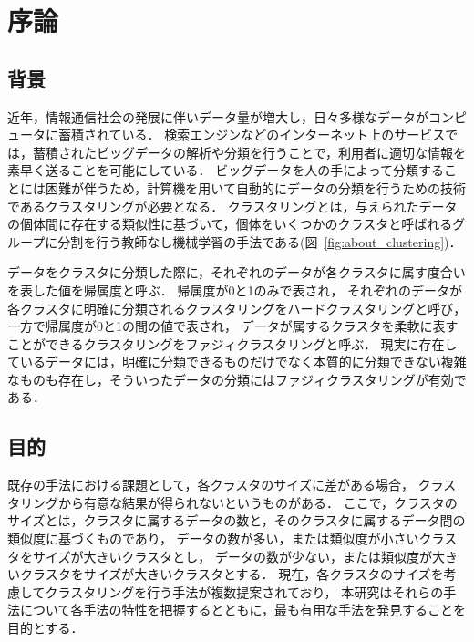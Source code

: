 \documentclass[a4j,12pt,dvipdfmx,oneside]{jsbook}
\theoremstyle{definition}
\begin{document}
\pagestyle{headings}
\def\thepage{\roman{page}}

\tableofcontents
\listoffigures
\listoftables
\newpage
\pagestyle{myheadings}

\chapter{序論}
\def\thepage{\arabic{page}}
\setcounter{page}{1}
\label{chap:first}

 \section{背景}\label{sec:background}
 
 近年，情報通信社会の発展に伴いデータ量が増大し，日々多様なデータがコンピュータに蓄積されている．
 検索エンジンなどのインターネット上のサービスでは，蓄積されたビッグデータの解析や分類を行うことで，利用者に適切な情報を素早く送ることを可能にしている．
 ビッグデータを人の手によって分類することには困難が伴うため，計算機を用いて自動的にデータの分類を行うための技術であるクラスタリングが必要となる．
 クラスタリングとは，与えられたデータの個体間に存在する類似性に基づいて，個体をいくつかのクラスタと呼ばれるグループに分割を行う教師なし機械学習の手法である(図~\ref{fig:about_clustering})．
 
 データをクラスタに分類した際に，それぞれのデータが各クラスタに属す度合いを表した値を帰属度と呼ぶ．
 帰属度が0と1のみで表され，
 それぞれのデータが各クラスタに明確に分類されるクラスタリングをハードクラスタリングと呼び，一方で帰属度が0と1の間の値で表され，
 データが属するクラスタを柔軟に表すことができるクラスタリングをファジィクラスタリングと呼ぶ．
 現実に存在しているデータには，明確に分類できるものだけでなく本質的に分類できない複雑なものも存在し，そういったデータの分類にはファジィクラスタリングが有効である．

 \section{目的}\label{sec:purpose}

 既存の手法における課題として，各クラスタのサイズに差がある場合，
 クラスタリングから有意な結果が得られないというものがある．
 ここで，クラスタのサイズとは，クラスタに属するデータの数と，そのクラスタに属するデータ間の類似度に基づくものであり，
 データの数が多い，または類似度が小さいクラスタをサイズが大きいクラスタとし，
 データの数が少ない，または類似度が大きいクラスタをサイズが大きいクラスタとする．
 現在，各クラスタのサイズを考慮してクラスタリングを行う手法が複数提案されており，
 本研究はそれらの手法について各手法の特性を把握するとともに，最も有用な手法を発見することを目的とする．
\end{document}

